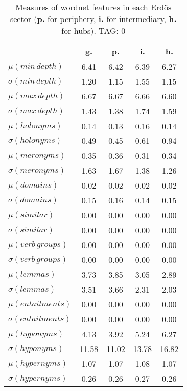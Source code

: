 \begin{table}[h!]
\begin{center}
\begin{tabular}{| l || c | c | c | c |}\hline
 & {\bf g.} & {\bf p.} & {\bf i.} & {\bf h.} \\\hline\hline
$\mu(min\,depth)$ & 6.41  & 6.42  & 6.39  & 6.27 \\
$\sigma(min\,depth)$ & 1.20  & 1.15  & 1.55  & 1.15 \\\hline
$\mu(max\,depth)$ & 6.67  & 6.67  & 6.66  & 6.60 \\
$\sigma(max\,depth)$ & 1.43  & 1.38  & 1.74  & 1.59 \\\hline
$\mu(holonyms)$ & 0.14  & 0.13  & 0.16  & 0.14 \\
$\sigma(holonyms)$ & 0.49  & 0.45  & 0.61  & 0.94 \\\hline
$\mu(meronyms)$ & 0.35  & 0.36  & 0.31  & 0.34 \\
$\sigma(meronyms)$ & 1.63  & 1.67  & 1.38  & 1.26 \\\hline
$\mu(domains)$ & 0.02  & 0.02  & 0.02  & 0.02 \\
$\sigma(domains)$ & 0.15  & 0.16  & 0.14  & 0.15 \\\hline
$\mu(similar)$ & 0.00  & 0.00  & 0.00  & 0.00 \\
$\sigma(similar)$ & 0.00  & 0.00  & 0.00  & 0.00 \\\hline
$\mu(verb\,groups)$ & 0.00  & 0.00  & 0.00  & 0.00 \\
$\sigma(verb\,groups)$ & 0.00  & 0.00  & 0.00  & 0.00 \\\hline
$\mu(lemmas)$ & 3.73  & 3.85  & 3.05  & 2.89 \\
$\sigma(lemmas)$ & 3.51  & 3.66  & 2.31  & 2.03 \\\hline
$\mu(entailments)$ & 0.00  & 0.00  & 0.00  & 0.00 \\
$\sigma(entailments)$ & 0.00  & 0.00  & 0.00  & 0.00 \\\hline
$\mu(hyponyms)$ & 4.13  & 3.92  & 5.24  & 6.27 \\
$\sigma(hyponyms)$ & 11.58  & 11.02  & 13.78  & 16.82 \\\hline
$\mu(hypernyms)$ & 1.07  & 1.07  & 1.08  & 1.07 \\
$\sigma(hypernyms)$ & 0.26  & 0.26  & 0.27  & 0.26 \\\hline
\end{tabular}
\caption{Measures of wordnet features in each Erd\"os sector ({{\bf p.}} for periphery, {{\bf i.}} for intermediary, {{\bf h.}} for hubs). TAG: 0}
\end{center}
\end{table}